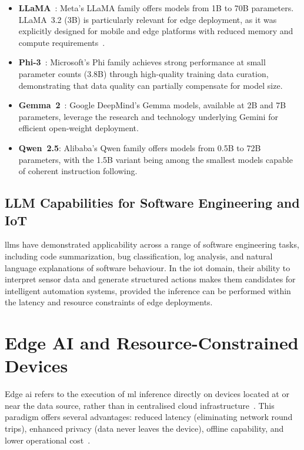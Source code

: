 \documentclass[12pt,a4paper,oneside]{report}
\begin{document}
\begin{itemize}
    \item \textbf{LLaMA}~\cite{touvron2023llama,touvron2023llama2}: Meta's LLaMA family offers models from 1B to 70B parameters. LLaMA~3.2 (3B) is particularly relevant for edge deployment, as it was explicitly designed for mobile and edge platforms with reduced memory and compute requirements~\cite{meta2024llama3}.

    \item \textbf{Phi-3}~\cite{abdin2024phi3}: Microsoft's Phi family achieves strong performance at small parameter counts (3.8B) through high-quality training data curation, demonstrating that data quality can partially compensate for model size.

    \item \textbf{Gemma~2}~\cite{google2024gemma}: Google DeepMind's Gemma models, available at 2B and 7B parameters, leverage the research and technology underlying Gemini for efficient open-weight deployment.

    \item \textbf{Qwen~2.5}: Alibaba's Qwen family offers models from 0.5B to 72B parameters, with the 1.5B variant being among the smallest models capable of coherent instruction following.
\end{itemize}

\subsection{LLM Capabilities for Software Engineering and IoT}

\glspl{llm} have demonstrated applicability across a range of software engineering tasks, including code summarization, bug classification, log analysis, and natural language explanations of software behaviour. In the \gls{iot} domain, their ability to interpret sensor data and generate structured actions makes them candidates for intelligent automation systems, provided the inference can be performed within the latency and resource constraints of edge deployments.


\section{Edge AI and Resource-Constrained Devices}
\label{sec:sota-edgeai}

Edge \gls{ai} refers to the execution of \gls{ml} inference directly on devices located at or near the data source, rather than in centralised cloud infrastructure~\cite{chen2019deep}. This paradigm offers several advantages: reduced latency (eliminating network round trips), enhanced privacy (data never leaves the device), offline capability, and lower operational cost~\cite{dhar2021survey}.
\end{document}
